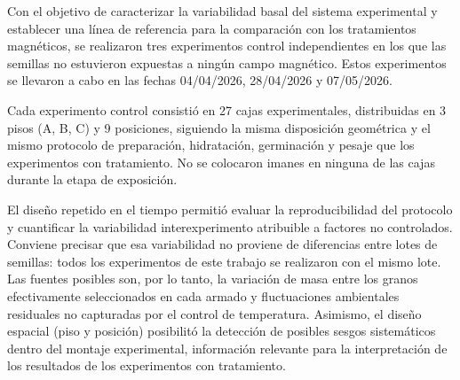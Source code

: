 Con el objetivo de caracterizar la variabilidad basal del sistema experimental y establecer una línea de referencia para la comparación con los tratamientos magnéticos, se realizaron tres experimentos control independientes en los que las semillas no estuvieron expuestas a ningún campo magnético. Estos experimentos se llevaron a cabo en las fechas 04/04/2026, 28/04/2026 y 07/05/2026.

Cada experimento control consistió en 27 cajas experimentales, distribuidas en 3 pisos (A, B, C) y 9 posiciones, siguiendo la misma disposición geométrica y el mismo protocolo de preparación, hidratación, germinación y pesaje que los experimentos con tratamiento. No se colocaron imanes en ninguna de las cajas durante la etapa de exposición.

El diseño repetido en el tiempo permitió evaluar la reproducibilidad del protocolo y cuantificar la variabilidad interexperimento atribuible a factores no controlados. Conviene precisar que esa variabilidad no proviene de diferencias entre lotes de semillas: todos los experimentos de este trabajo se realizaron con el mismo lote. Las fuentes posibles son, por lo tanto, la variación de masa entre los granos efectivamente seleccionados en cada armado y fluctuaciones ambientales residuales no capturadas por el control de temperatura. Asimismo, el diseño espacial (piso y posición) posibilitó la detección de posibles sesgos sistemáticos dentro del montaje experimental, información relevante para la interpretación de los resultados de los experimentos con tratamiento.
